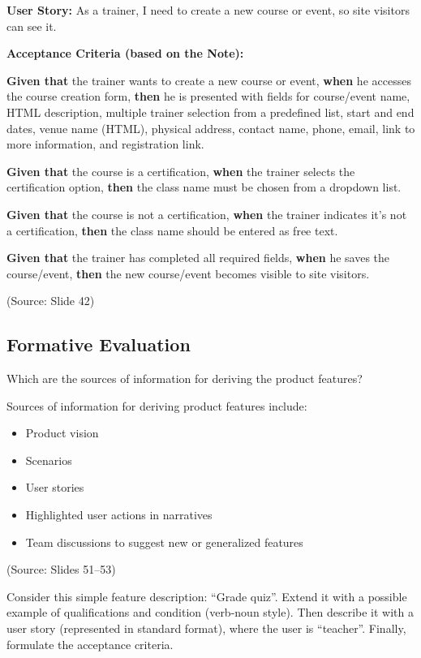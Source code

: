 \documentclass[12pt]{article}
\begin{document}
\textbf{User Story:} As a trainer, I need to create a new course or event, so site visitors can see it.

\textbf{Acceptance Criteria (based on the Note):}

\textbf{Given that} the trainer wants to create a new course or event, \textbf{when} he accesses the course creation form, \textbf{then} he is presented with fields for course/event name, HTML description, multiple trainer selection from a predefined list, start and end dates, venue name (HTML), physical address, contact name, phone, email, link to more information, and registration link.

\textbf{Given that} the course is a certification, \textbf{when} the trainer selects the certification option, \textbf{then} the class name must be chosen from a dropdown list.

\textbf{Given that} the course is not a certification, \textbf{when} the trainer indicates it's not a certification, \textbf{then} the class name should be entered as free text.

\textbf{Given that} the trainer has completed all required fields, \textbf{when} he saves the course/event, \textbf{then} the new course/event becomes visible to site visitors.

(Source: Slide 42)

\subsection{Formative Evaluation}

\begin{questionbox}
Which are the sources of information for deriving the product features?
\end{questionbox}

Sources of information for deriving product features include:
\begin{itemize}
    \item Product vision
    \item Scenarios
    \item User stories
    \item Highlighted user actions in narratives
    \item Team discussions to suggest new or generalized features
\end{itemize}

(Source: Slides 51--53)

\begin{questionbox}
Consider this simple feature description: ``Grade quiz''. Extend it with a possible example of qualifications and condition (verb-noun style). Then describe it with a user story (represented in standard format), where the user is ``teacher''. Finally, formulate the acceptance criteria.
\end{questionbox}
\end{document}
